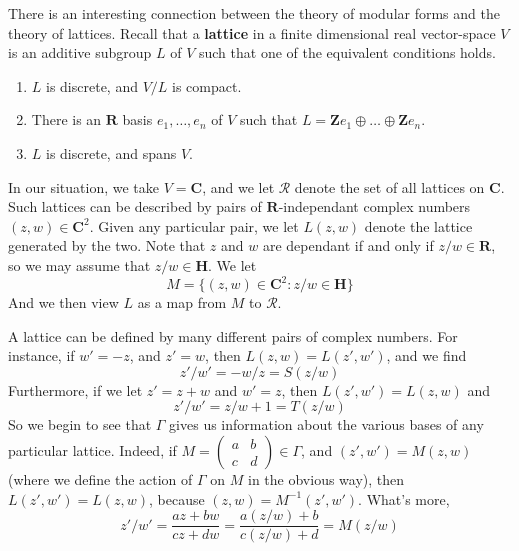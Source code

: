 There is an interesting connection between the theory of modular forms and the theory of lattices. Recall that a {\bf lattice} in a finite dimensional real vector-space $V$ is an additive subgroup $L$ of $V$ such that one of the equivalent conditions holds.
%
\begin{enumerate}
    \item $L$ is discrete, and $V/L$ is compact.
    \item There is an $\mathbf{R}$ basis $e_1, \dots, e_n$ of $V$ such that $L = \mathbf{Z} e_1 \oplus \dots \oplus \mathbf{Z} e_n$.
    \item $L$ is discrete, and spans $V$.
\end{enumerate}
%
In our situation, we take $V = \mathbf{C}$, and we let $\mathcal{R}$ denote the set of all lattices on $\mathbf{C}$. Such lattices can be described by pairs of $\mathbf{R}$-independant complex numbers $(z,w) \in \mathbf{C}^2$. Given any particular pair, we let $L(z,w)$ denote the lattice generated by the two. Note that $z$ and $w$ are dependant if and only if $z/w \in \mathbf{R}$, so we may assume that $z/w \in \mathbf{H}$. We let
%
\[ M = \{ (z,w) \in \mathbf{C}^2 : z/w \in \mathbf{H} \} \]
%
And we then view $L$ as a map from $M$ to $\mathcal{R}$.

A lattice can be defined by many different pairs of complex numbers. For instance, if $w' = -z$, and $z' = w$, then $L(z,w) = L(z',w')$, and we find
%
\[ z'/w' = -w/z = S(z/w) \]
%
Furthermore, if we let $z' = z + w$ and $w' = z$, then $L(z',w') = L(z,w)$ and
%
\[ z'/w' = z/w + 1 = T(z/w) \]
%
So we begin to see that $\Gamma$ gives us information about the various bases of any particular lattice. Indeed, if $M = \left( \begin{smallmatrix} a & b \\ c & d \end{smallmatrix} \right) \in \Gamma$, and $(z',w') = M(z,w)$ (where we define the action of $\Gamma$ on $M$ in the obvious way), then $L(z', w') = L(z, w)$, because $(z,w) = M^{-1}(z',w')$. What's more,
%
\[ z'/w' = \frac{az + bw}{cz + dw} = \frac{a(z/w) + b}{c(z/w) + d} = M(z/w) \]


